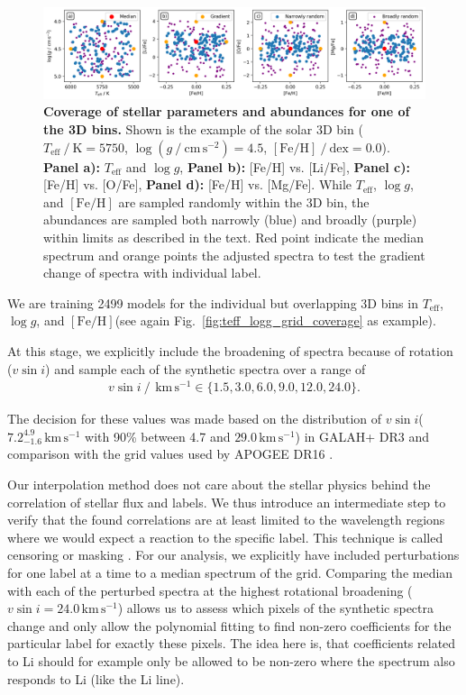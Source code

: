 \documentclass[
  journal=pasa,
  manuscript=research-paper, %
  year=2021,
  volume=37,
]{cup-journal}
\newcommand{\Teff}{$T_\mathrm{eff}$\xspace}
\newcommand{\logg}{$\log g$\xspace}
\newcommand{\feh}{$\mathrm{[Fe/H]}$\xspace}
\newcommand{\vsini}{$v \sin i$\xspace}
\newcommand{\kms}{\,\mathrm{km\,s^{-1}}}	%
\begin{document}
\begin{figure}[hbt!]
 \centering
 \includegraphics[width=\textwidth]{figures/example_3d_bin_sample.png}
 \caption{\textbf{Coverage of stellar parameters and abundances for one of the 3D bins.} Shown is the example of the solar 3D bin ($T_\mathrm{eff}~/~\mathrm{K} = 5750$, $\log (g~/~\mathrm{cm\,s^{-2}}) = 4.5$, $\mathrm{[Fe/H]}~/~\mathrm{dex} = 0.0$). \textbf{Panel a):} \Teff and \logg, \textbf{Panel b):} [Fe/H] vs. [Li/Fe], \textbf{Panel c):} [Fe/H] vs. [O/Fe], \textbf{Panel d):} [Fe/H] vs. [Mg/Fe]. While \Teff, \logg, and \feh are sampled randomly within the 3D bin, the abundances are sampled both narrowly (blue) and broadly (purple) within limits as described in the text. Red point indicate the median spectrum and orange points the adjusted spectra to test the gradient change of spectra with individual label.}
 \label{fig:cannon_interpolation}
\end{figure}

We are training 2499 models for the individual but overlapping 3D bins in \Teff, \logg, and \feh (see again Fig.~\ref{fig:teff_logg_grid_coverage} as example).

At this stage, we explicitly include the broadening of spectra because of rotation (\vsini) and sample each of the synthetic spectra over a range of
\begin{align} \label{eq:vsini}
    v \sin i~/~\kms \in \{ 1.5, 3.0, 6.0, 9.0, 12.0, 24.0\}.
\end{align}

The decision for these values was made based on the distribution of \vsini ($7.2_{-1.6}^{4.9}\kms$ with 90\% between 4.7 and $29.0\kms$) in GALAH+ DR3 and comparison with the grid values used by APOGEE DR16 \citep{Joensson2020}.

Our interpolation method does not care about the stellar physics behind the correlation of stellar flux and labels. We thus introduce an intermediate step to verify that the found correlations are at least limited to the wavelength regions where we would expect a reaction to the specific label. This technique is called censoring \citep{Casey2016} or masking \citep{Buder2018}. For our analysis, we explicitly have included perturbations for one label at a time to a median spectrum of the grid. Comparing the median with each of the perturbed spectra at the highest rotational broadening ($v \sin i = 24.0\kms$) allows us to assess which pixels of the synthetic spectra change and only allow the polynomial fitting to find non-zero coefficients for the particular label for exactly these pixels. The idea here is, that coefficients related to Li should for example only be allowed to be non-zero where the spectrum also responds to Li (like the Li line).
\end{document}
